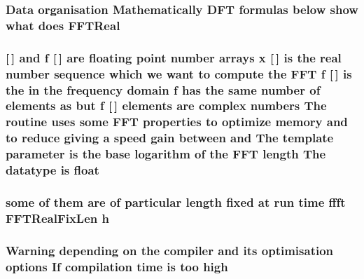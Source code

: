 \subsubsection[{\texorpdfstring{F\+F\+T\+Real}{FFTReal}}]{\setlength{\rightskip}{0pt plus 5cm}Data organisation Mathematically D\+FT formulas {\bf below} show what does F\+F\+T\+Real}\hypertarget{FFTReal__readme_8txt_afc545541c7ab0be25cf239418fc47b65}{}\label{FFTReal__readme_8txt_afc545541c7ab0be25cf239418fc47b65}
\subsubsection[{\texorpdfstring{float}{float}}]{ \mbox{[}$\,$\mbox{]} and {\bf f} \mbox{[}$\,$\mbox{]} are floating point number arrays {\bf x} \mbox{[}$\,$\mbox{]} is the real number sequence which we want to compute the F\+FT {\bf f} \mbox{[}$\,$\mbox{]} is the in the frequency domain {\bf f} has the same number of elements as but {\bf f} \mbox{[}$\,$\mbox{]} elements are complex numbers The routine uses some F\+FT properties to optimize memory and to reduce giving a speed gain between and The template parameter is the base logarithm of the F\+FT length The datatype is float}\hypertarget{FFTReal__readme_8txt_a0ea2fae2a8106200bf378b90eae003cf}{}\label{FFTReal__readme_8txt_a0ea2fae2a8106200bf378b90eae003cf}
\subsubsection[{\texorpdfstring{h}{h}}]{\setlength{\rightskip}{0pt plus 5cm}some of them are of particular length fixed at run time ffft F\+F\+T\+Real\+Fix\+Len h}\hypertarget{FFTReal__readme_8txt_a5a475fe9e77e2d776b063abc32a10e20}{}\label{FFTReal__readme_8txt_a5a475fe9e77e2d776b063abc32a10e20}
\subsubsection[{\texorpdfstring{high}{high}}]{\setlength{\rightskip}{0pt plus 5cm}Warning depending on the compiler and its optimisation options If compilation time is too high}\hypertarget{FFTReal__readme_8txt_af1a4dd6a27c987e5516ef3295e3e51f0}{}\label{FFTReal__readme_8txt_af1a4dd6a27c987e5516ef3295e3e51f0}
